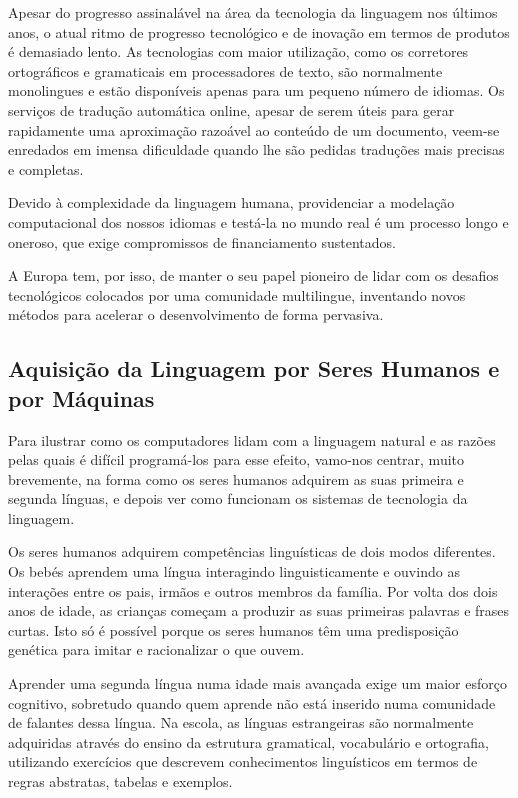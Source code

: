 \begin{multicols}{2}
Apesar do progresso assinalável na área da tecnologia da linguagem nos últimos anos, o atual ritmo de progresso tecnológico e de inovação em termos de produtos 
é demasiado lento. As tecnologias com maior utilização, como os corretores ortográficos e gramaticais em processadores de texto, são normalmente 
monolingues e estão disponíveis apenas para um pequeno número de idiomas. Os serviços de tradução automática online, apesar de serem úteis para 
gerar rapidamente uma aproximação razoável ao conteúdo de um documento, veem-se enredados em imensa dificuldade quando lhe são pedidas 
traduções mais precisas e completas. 


Devido à complexidade da linguagem humana, 
providenciar a modelação computacional dos nossos idiomas e testá-la no mundo real 
é um processo longo e oneroso, que exige compromissos de financiamento sustentados.

A Europa tem, por isso, de manter o seu papel pioneiro de lidar com os desafios tecnológicos colocados por uma comunidade multilingue, 
inventando novos métodos para acelerar o desenvolvimento de forma pervasiva.

\subsection{Aquisição da Linguagem por Seres Humanos e por Máquinas}

 Para ilustrar como os computadores lidam com a linguagem natural e as razões pelas quais é difícil pro\-gra\-má-los para esse efeito, vamo-nos centrar, muito brevemente, na forma como os seres humanos adquirem as suas primeira e segunda línguas, e depois ver como funcionam os sistemas de tecnologia da linguagem.

Os seres humanos adquirem competências linguísticas de dois modos diferentes. Os bebés aprendem uma língua interagindo linguisticamente e ouvindo as interações entre os pais, irmãos e outros membros da família. Por volta dos dois anos de idade, as crianças começam a produzir as suas primeiras palavras e frases curtas. Isto só é possível porque os seres humanos têm uma predisposição genética para imitar e racionalizar o que ouvem.

Aprender uma segunda língua numa idade mais avançada exige um maior esforço cognitivo, sobretudo quando quem aprende não está inserido numa comunidade de falantes dessa língua. Na escola, as línguas estrangeiras são normalmente adquiridas através do ensino da estrutura gramatical, vocabulário e ortografia, utilizando exercícios que descrevem co\-nhe\-ci\-men\-tos linguísticos em termos de regras abstratas, tabelas e exemplos.


\end{multicols}
